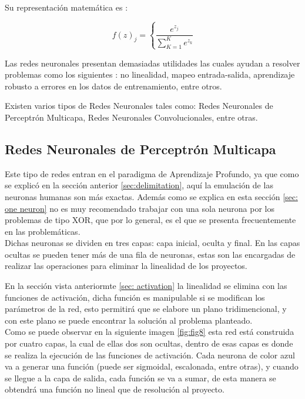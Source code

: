                 Su representaci\'on matem\'atica es \cite{calvo-2018}:

                \[f(z)_j = \left\{ \frac{e^{z_j}}{\sum_{K=1}^{K} e^{z_k}} \right. \]

        Las redes neuronales presentan demasiadas utilidades las cuales ayudan a resolver problemas como los 
        siguientes \cite{liu2015}: no linealidad, mapeo entrada-salida, aprendizaje robusto 
        a errores en los datos de entrenamiento, entre otros.

        Existen varios tipos de Redes Neuronales tales como: Redes Neuronales de Perceptr\'on 
        Multicapa, Redes Neuronales Convolucionales, entre otras.
    
        \subsection{Redes Neuronales de Perceptr\'on Multicapa}
        
        Este tipo de redes entran en el paradigma de Aprendizaje Profundo, ya que como se explic\'o en 
            la secci\'on anterior \eqref{sec:delimitation}, aqu\'i la emulaci\'on de las neuronas humanas son m\'as 
            exactas.
            Adem\'as como se explica en esta sección \eqref{sec: one neuron} no es muy recomendado trabajar con una sola 
            neurona por los problemas de tipo XOR, que por lo general, es el que se presenta frecuentemente en las problemáticas.\\

            Dichas neuronas se dividen en tres capas: capa inicial, oculta y final. En las capas ocultas se pueden 
            tener m\'as de una fila de neuronas, estas son las encargadas de realizar las operaciones para eliminar 
            la linealidad de los proyectos. 

            En la secci\'on vista anteriormte \eqref{sec: activation} la linealidad se elimina con las funciones de activaci\'on, dicha funci\'on 
            es manipulable si se modifican los parámetros de la red, esto permitirá que se elabore un plano tridimencional, y con este plano se puede encontrar la soluci\'on al problema planteado.\\
            
            Como se puede observar en la siguiente imagen \eqref{fig:fig8} esta red est\'a
            construida por cuatro capas, la cual de ellas dos son ocultas, dentro de esas 
            capas es donde se realiza la ejecuci\'on de las funciones de activaci\'on. 
            Cada neurona de color azul va a generar una funci\'on (puede ser sigmoidal, escalonada, entre otras), 
            y cuando se llegue a la capa de salida, cada funci\'on se va a sumar, de esta manera 
            se obtendrá una funci\'on no lineal que de resoluci\'on al proyecto.

